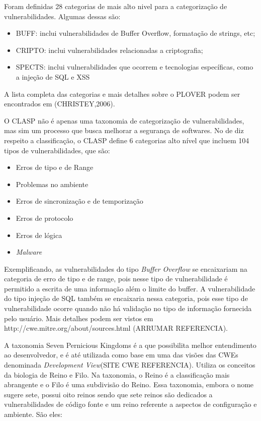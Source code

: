 %

Foram definidas 28 categorias de mais alto nivel para a categorização de vulnerabilidades. Algumas dessas são:

\begin{itemize}
\item BUFF: inclui vulnerabilidades de Buffer Overflow, formatação de strings, etc;
\item CRIPTO: inclui vulnerabilidades relacionadas a criptografia;
\item SPECTS: inclui vulnerabilidades que ocorrem e tecnologias específicas, como a injeção de SQL e XSS
\end{itemize}

A lista completa das categorias e mais detalhes sobre o PLOVER podem ser encontrados em (CHRISTEY,2006).

%

O CLASP não é apenas uma taxonomia de categorização de vulnerabilidades, mas sim um processo que busca melhorar a segurança de softwares. No de diz respeito a classificação, o CLASP define 6 categorias alto nível que incluem 104 tipos de vulnerabilidades, que são:

\begin{itemize}
\item Erros de tipo e de Range
\item Problemas no ambiente 
\item Erros de sincronização e de temporização
\item Erros de protocolo
\item Erros de lógica
\item \emph{Malware}
\end{itemize}

%
Exemplificando, as vulnerabilidades do tipo \emph{Buffer Overflow} se encaixariam na categoria de erro de tipo e de range, pois nesse tipo de vulnerabilidade é permitido a escrita de uma informação além o limite do buffer. A vulnerabilidade do tipo  injeção de SQL também se encaixaria nessa categoria, pois esse tipo de vulnerabilidade ocorre quando não há validação no tipo de informação fornecida pelo usuário. Mais detalhes podem ser vistos em http://cwe.mitre.org/about/sources.html (ARRUMAR REFERENCIA).

%

A taxonomia Seven Pernicious Kingdoms é a que possibilita melhor entendimento ao desenvolvedor, e é até utilizada como base em uma das visões das CWEs denominada \emph{Development View}(SITE CWE REFERENCIA). Utiliza os conceitos da biologia de Reino e Filo. Na taxonomia, o Reino é a classificação mais abrangente e o Filo é uma subdivisão do Reino. Essa taxonomia, embora o nome sugere sete, possui oito reinos sendo que sete reinos são dedicados a vulnerabilidades de código fonte e um reino referente a aspectos de configuração e ambiente. São eles:

